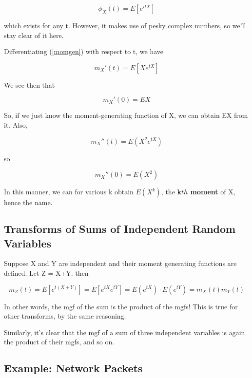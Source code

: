\begin{equation}
\phi_X(t) = E[e^{itX}] 
\end{equation}

which exists for any t.  However, it makes use of pesky complex numbers,
so we'll stay clear of it here.

Differentiating (\ref{momgen}) with respect to t, we have

\begin{equation}
m_X'(t) = E[X e^{tX}] 
\end{equation}

We see then that

\begin{equation}
m_X'(0) = EX
\end{equation}

So, if we just know the moment-generating function of X, we can obtain
EX from it.  Also,

\begin{equation}
m_X''(t) = E(X^2 e^{tX})
\end{equation}

so

\begin{equation}
m_X''(0) = E(X^2)
\end{equation}

In this manner, we can for various k obtain $E(X^k)$, the {\bf k$th$
moment} of X, hence the name.

\subsection{Transforms of Sums of Independent Random Variables}
\label{tranfssums}

Suppose X and Y are independent and their moment generating functions
are defined.  Let Z = X+Y.  then

\begin{equation}
m_Z(t) = E[e^{t(X+Y)}] = E[e^{tX} e^{tY}] = E(e^{tX}) \cdot E(e^{tY}) =
m_X(t) m_Y(t)
\end{equation}

In other words, the mgf of the sum is the product of the mgfs!  This is
true for other transforms, by the same reasoning.

Similarly, it's clear that the mgf of a sum of three independent
variables is again the product of their mgfs, and so on.

\subsection{Example:  Network Packets}

